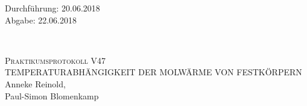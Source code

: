 



\begin{titlepage}
  \begin{flushleft}
 Durchführung: 20.06.2018\\
 Abgabe: 22.06.2018
  \end{flushleft}


\HRule\\[1,0cm]

 \begin{center}


\textsc{\LARGE Praktikumsprotokoll V47}\\[1.5cm]
\textsc{\huge TEMPERATURABHÄNGIGKEIT DER MOLWÄRME VON FESTKÖRPERN} \\[5,5cm]

Anneke Reinold\footnotemark[1], \\
Paul-Simon Blomenkamp\footnotemark[2] \\[1,0cm]



 \end{center}
\HRule

 \vfill

\end{titlepage}






\printbibliography


